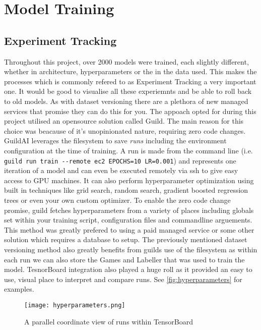 \section{Model Training}

\subsection{Experiment Tracking}
Throughout this project, over 2000 models were trained, each slightly different, whether in architecture, hyperparameters or the in the data used.  
This makes the processes which is commonly refered to as Experiment Tracking a very important one.
It would be good to visualise all these experiemnts and be able to roll back to old models.  As with dataset versioning there are a plethora of 
new managed services that promise they can do this for you.
The appoach opted for during this project utilised an opensource solution called Guild.  The main reason for this choice was beacause of 
it's unopinionated nature, requiring zero code changes.  GuildAI leverages the filesystem to save \textit{runs} including the environment configuration
at the time of training.  A run is made from the command line (i.e. \verb|guild run train --remote ec2 EPOCHS=10 LR=0.001|) and
represents one iteration of a model and can even be executed remotely via ssh to give easy access to 
GPU machines.  It can also perform hyperparameter optimization using built in techniques like grid search, random search, gradient boosted regression trees 
or even your own custom optimizer.  To enable the zero code change promise, guild fetches hyperparameters from a variety of places including globals set within 
your training script, configuration files and commandline arguements.
This method was greatly prefered to using a paid managed service or some other solution which requires a database to setup.  
The previously mentioned dataset versioning method also greatly benefits from guilds use of the filesystem as within each run we can also store 
the Games and Labeller that was used to train the model. 
TesnorBoard integration also played a huge roll as it provided an easy to use, visual place to interpret and compare runs.  See \autoref{fig:hyperparameters}
for examples.

\begin{figure}[h]
    \centering
    \texttt{[image: hyperparameters.png]}
    \caption{A parallel coordinate view of runs within TensorBoard}
    \label{fig:hyperparameters}
\end{figure}


